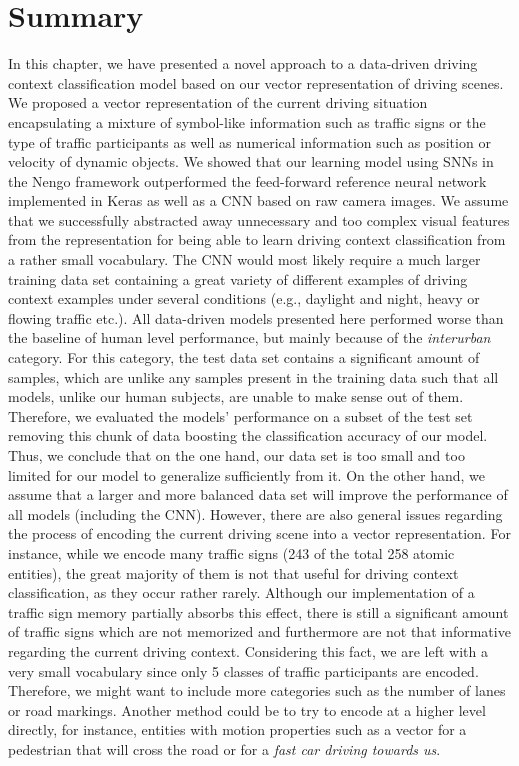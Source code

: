 \section{Summary}%
\label{sec:summary_context_classification}

In this chapter, we have presented a novel approach to a data-driven driving context classification model based on our vector representation of driving scenes.
We proposed a vector representation of the current driving situation encapsulating a mixture of symbol-like information such as traffic signs or the type of traffic participants as well as numerical information such as position or velocity of dynamic objects.
We showed that our learning model using \acp{SNN} in the \ac{Nengo} framework outperformed the feed-forward reference neural network implemented in Keras as well as a \ac{CNN} based on raw camera images.
We assume that we successfully abstracted away unnecessary and too complex visual features from the representation for being able to learn driving context classification from a rather small vocabulary.
The \ac{CNN} would most likely require a much larger training data set containing a great variety of different examples of driving context examples under several conditions (e.g., daylight and night, heavy or flowing traffic etc.).
All data-driven models presented here performed worse than the baseline of human level performance, but mainly because of the \emph{interurban} category.
For this category, the test data set contains a significant amount of samples, which are unlike any samples present in the training data such that all models, unlike our human subjects, are unable to make sense out of them.
Therefore, we evaluated the models' performance on a subset of the test set removing this chunk of data boosting the classification accuracy of our model.
Thus, we conclude that on the one hand, our data set is too small and too limited for our model to generalize sufficiently from it.
On the other hand, we assume that a larger and more balanced data set will improve the performance of all models (including the \ac{CNN}). 
However, there are also general issues regarding the process of encoding the current driving scene into a vector representation.
For instance, while we encode many traffic signs (\num{243} of the total \num{258} atomic entities), the great majority of them is not that useful for driving context classification, as they occur rather rarely.
Although our implementation of a traffic sign memory partially absorbs this effect, there is still a significant amount of traffic signs which are not memorized and furthermore are not that informative regarding the current driving context.
Considering this fact, we are left with a very small vocabulary since only \num{5} classes of traffic participants are encoded.
Therefore, we might want to include more categories such as the number of lanes or road markings.
Another method could be to try to encode at a higher level directly, for instance, entities with motion properties such as a vector for a pedestrian that will cross the road or for a \emph{fast car driving towards us}.

